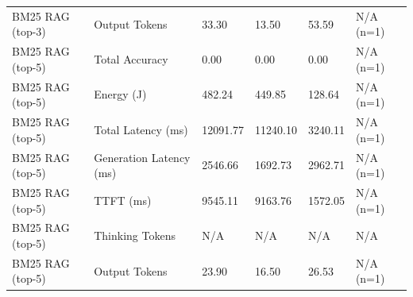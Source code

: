 \begin{table}
\begin{tabular}{llllll}
BM25 RAG (top-3) & Output Tokens & 33.30 & 13.50 & 53.59 & N/A (n=1) \\
BM25 RAG (top-5) & Total Accuracy & 0.00 & 0.00 & 0.00 & N/A (n=1) \\
BM25 RAG (top-5) & Energy (J) & 482.24 & 449.85 & 128.64 & N/A (n=1) \\
BM25 RAG (top-5) & Total Latency (ms) & 12091.77 & 11240.10 & 3240.11 & N/A (n=1) \\
BM25 RAG (top-5) & Generation Latency (ms) & 2546.66 & 1692.73 & 2962.71 & N/A (n=1) \\
BM25 RAG (top-5) & TTFT (ms) & 9545.11 & 9163.76 & 1572.05 & N/A (n=1) \\
BM25 RAG (top-5) & Thinking Tokens & N/A & N/A & N/A & N/A \\
BM25 RAG (top-5) & Output Tokens & 23.90 & 16.50 & 26.53 & N/A (n=1) \\
\bottomrule
\end{tabular}
\end{table}
